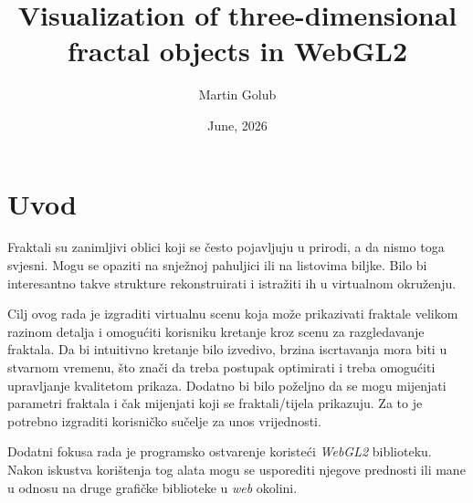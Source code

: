 \documentclass[zavrsnirad, upload]{fer}
\title{Visualization of three-dimensional fractal objects in WebGL2}
\author{Martin Golub}
\date{June, 2026}
\begin{document}
\maketitle




\begin{zahvale}
\end{zahvale}

\mainmatter

\tableofcontents


\chapter{Uvod}
\label{pog:uvod}

Fraktali su zanimljivi oblici koji se često pojavljuju u prirodi, a da nismo toga svjesni. Mogu se opaziti na snježnoj pahuljici ili na listovima biljke. Bilo bi interesantno takve strukture rekonstruirati i istražiti ih u virtualnom okruženju.

Cilj ovog rada je izgraditi virtualnu scenu koja može prikazivati fraktale velikom razinom detalja i omogućiti korisniku kretanje kroz scenu za razgledavanje fraktala. Da bi intuitivno kretanje bilo izvedivo, brzina iscrtavanja mora biti u stvarnom vremenu, što znači da treba postupak optimirati i treba omogućiti upravljanje kvalitetom prikaza. Dodatno bi bilo poželjno da se mogu mijenjati parametri fraktala i čak mijenjati koji se fraktali/tijela prikazuju. Za to je potrebno izgraditi korisničko sučelje za unos vrijednosti.

Dodatni fokusa rada je programsko ostvarenje koristeći \emph{WebGL2} biblioteku. Nakon iskustva korištenja tog alata mogu se usporediti njegove prednosti ili mane u odnosu na druge grafičke biblioteke u \emph{web} okolini.
\end{document}
